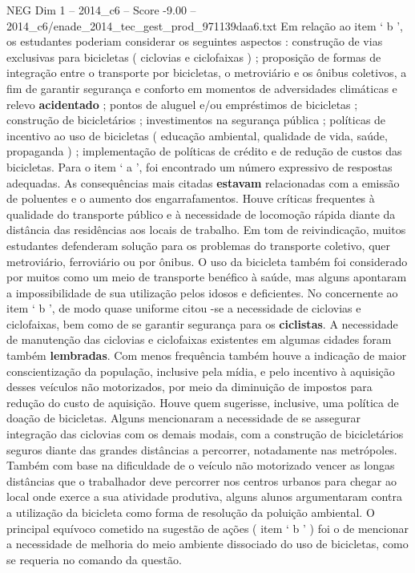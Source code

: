\begin{textsample}{NEG Dim 1 – 2014\_c6 – Score -9.00 – 2014\_c6/enade\_2014\_tec\_gest\_prod\_971139daa6.txt}
Em relação ao item ‘ b ’, os estudantes poderiam considerar os seguintes aspectos : construção de vias exclusivas para bicicletas ( ciclovias e ciclofaixas ) ; proposição de formas de integração entre o transporte por bicicletas, o metroviário e os ônibus coletivos, a fim de garantir segurança e conforto em momentos de adversidades climáticas e relevo \textbf{acidentado} ; pontos de aluguel e/ou empréstimos de bicicletas ; construção de bicicletários ; investimentos na segurança pública ; políticas de incentivo ao uso de bicicletas ( educação ambiental, qualidade de vida, saúde, propaganda ) ; implementação de políticas de crédito e de redução de custos das bicicletas.
Para o item ‘ a ’, foi encontrado um número expressivo de respostas adequadas.
As consequências mais citadas \textbf{estavam} relacionadas com a emissão de poluentes e o aumento dos engarrafamentos.
Houve críticas frequentes à qualidade do transporte público e à necessidade de locomoção rápida diante da distância das residências aos locais de trabalho.
Em tom de reivindicação, muitos estudantes defenderam solução para os problemas do transporte coletivo, quer metroviário, ferroviário ou por ônibus.
O uso da bicicleta também foi considerado por muitos como um meio de transporte benéfico à saúde, mas alguns apontaram a impossibilidade de sua utilização pelos idosos e deficientes.
No concernente ao item ‘ b ’, de modo quase uniforme citou -se a necessidade de ciclovias e ciclofaixas, bem como de se garantir segurança para os \textbf{ciclistas}.
A necessidade de manutenção das ciclovias e ciclofaixas existentes em algumas cidades foram também \textbf{lembradas}.
Com menos frequência também houve a indicação de maior conscientização da população, inclusive pela mídia, e pelo incentivo à aquisição desses veículos não motorizados, por meio da diminuição de impostos para redução do custo de aquisição.
Houve quem sugerisse, inclusive, uma política de doação de bicicletas.
Alguns mencionaram a necessidade de se assegurar integração das ciclovias com os demais modais, com a construção de bicicletários seguros diante das grandes distâncias a percorrer, notadamente nas metrópoles.
Também com base na dificuldade de o veículo não motorizado vencer as longas distâncias que o trabalhador deve percorrer nos centros urbanos para chegar ao local onde exerce a sua atividade produtiva, alguns alunos argumentaram contra a utilização da bicicleta como forma de resolução da poluição ambiental.
O principal equívoco cometido na sugestão de ações ( item ‘ b ’ ) foi o de mencionar a necessidade de melhoria do meio ambiente dissociado do uso de bicicletas, como se requeria no comando da questão.

\end{textsample}
